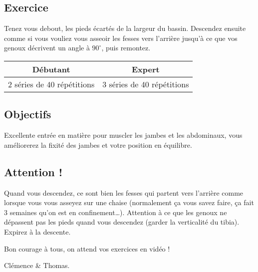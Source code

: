 \documentclass[12pt,a4paper]{article}
\subtitle{Fiche \no 1 -- Squats}
\begin{document}
\maketitle




\subsection*{Exercice}
	Tenez vous debout, les pieds écartés de la largeur du bassin. Descendez ensuite comme si vous vouliez vous asseoir les fesses vers l'arrière jusqu'à ce que vos genoux décrivent un angle à $90^\circ$, puis remontez.

	\begin{center}
		\begin{tabular}{c|c}
			\textbf{Débutant} & \textbf{Expert} \\
			\hline
			2 séries de 40 répétitions & 3 séries de 40 répétitions \\
		\end{tabular}
	\end{center}

\subsection*{Objectifs}
	Excellente entrée en matière pour muscler les jambes et les abdominaux, vous améliorerez la fixité des jambes et votre position en équilibre.

\subsection*{Attention !}
	Quand vous descendez, ce sont bien les fesses qui partent vers l'arrière comme lorsque vous vous asseyez sur une chaise (normalement ça vous savez faire, ça fait 3 semaines qu'on est en confinement\dots). Attention à ce que les genoux ne dépassent pas les pieds quand vous descendez (garder la verticalité du tibia). Expirez à la descente.

\vfill
\begin{flushright}
	Bon courage à tous, on attend vos exercices en vidéo ! \phantom{Clémence et Thomas}

	Clémence \& Thomas.
\end{flushright}
\end{document}
